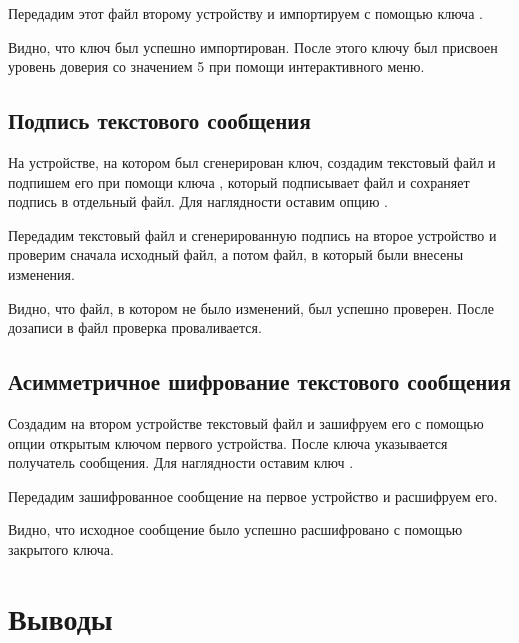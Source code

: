 

Передадим этот файл второму устройству и импортируем с помощью ключа .



Видно, что ключ был успешно импортирован. После этого ключу был присвоен уровень доверия со значением 5 при помощи интерактивного меню.



\subsection{Подпись текстового сообщения}

На устройстве, на котором был сгенерирован ключ, создадим текстовый файл  и подпишем его при помощи ключа , который подписывает файл и сохраняет подпись в отдельный файл. Для наглядности оставим опцию . 



Передадим текстовый файл и сгенерированную подпись на второе устройство и проверим сначала исходный файл, а потом файл, в который были внесены изменения.



Видно, что файл, в котором не было изменений, был успешно проверен. После дозаписи в файл проверка проваливается. 

\subsection{Асимметричное шифрование текстового сообщения}

Создадим на втором устройстве текстовый файл  и зашифруем его с помощью опции  открытым ключом первого устройства. После ключа  указывается получатель сообщения. Для наглядности оставим ключ . 



Передадим зашифрованное сообщение на первое устройство и расшифруем его.



Видно, что исходное сообщение было успешно расшифровано с помощью закрытого ключа.

\section{Выводы}

